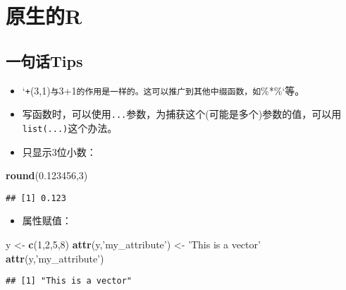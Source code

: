 \documentclass[
]{book}
\newenvironment{Shaded}{\begin{snugshade}}{\end{snugshade}}
\newcommand{\DecValTok}[1]{\textcolor[rgb]{0.00,0.00,0.81}{#1}}
\newcommand{\FloatTok}[1]{\textcolor[rgb]{0.00,0.00,0.81}{#1}}
\newcommand{\KeywordTok}[1]{\textcolor[rgb]{0.13,0.29,0.53}{\textbf{#1}}}
\newcommand{\NormalTok}[1]{#1}
\newcommand{\StringTok}[1]{\textcolor[rgb]{0.31,0.60,0.02}{#1}}
\providecommand{\tightlist}{%
  \setlength{\itemsep}{0pt}\setlength{\parskip}{0pt}}
\begin{document}
\hypertarget{rawR}{%
\chapter{原生的R}\label{rawR}}

\hypertarget{ux4e00ux53e5ux8bddtips-4}{%
\section{一句话Tips}\label{ux4e00ux53e5ux8bddtips-4}}

\begin{itemize}
\tightlist
\item
  `\texttt{+}(3,1)\texttt{与}3+1\texttt{的作用是一样的。这可以推广到其他中缀函数，如}\%*\%`等。
\item
  写函数时，可以使用\texttt{...}参数，为捕获这个(可能是多个)参数的值，可以用\texttt{list(...)}这个办法。
\item
  只显示3位小数：
\end{itemize}

\begin{Shaded}
\begin{Highlighting}[]
\KeywordTok{round}\NormalTok{(}\FloatTok{0.123456}\NormalTok{,}\DecValTok{3}\NormalTok{)}
\end{Highlighting}
\end{Shaded}

\begin{verbatim}
## [1] 0.123
\end{verbatim}

\begin{itemize}
\tightlist
\item
  属性赋值：
\end{itemize}

\begin{Shaded}
\begin{Highlighting}[]
\NormalTok{y <-}\StringTok{ }\KeywordTok{c}\NormalTok{(}\DecValTok{1}\NormalTok{,}\DecValTok{2}\NormalTok{,}\DecValTok{5}\NormalTok{,}\DecValTok{8}\NormalTok{)}
\KeywordTok{attr}\NormalTok{(y,}\StringTok{'my_attribute'}\NormalTok{) <-}\StringTok{ 'This is a vector'}
\KeywordTok{attr}\NormalTok{(y,}\StringTok{'my_attribute'}\NormalTok{)}
\end{Highlighting}
\end{Shaded}

\begin{verbatim}
## [1] "This is a vector"
\end{verbatim}
\end{document}
